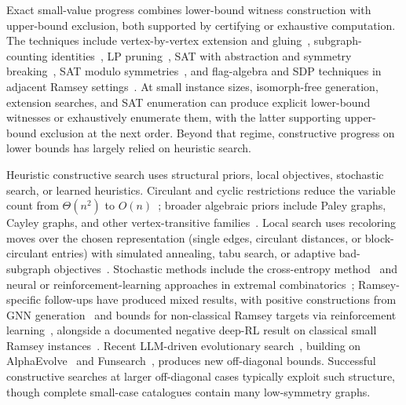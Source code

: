 \documentclass{article}
\begin{document}
Exact small-value progress combines lower-bound witness construction with upper-bound exclusion, both supported by certifying or exhaustive computation. The techniques include vertex-by-vertex extension and gluing~\cite{mckayradziszowski1995r45,angeltveitmckay2018r55leq48}, subgraph-counting identities~\cite{mckayradziszowski1997subgraph}, LP pruning~\cite{angeltveit2026r55leq46}, SAT with abstraction and symmetry breaking~\cite{codish2016r433}, SAT modulo symmetries~\cite{kirchwegerszeider2024}, and flag-algebra and SDP techniques in adjacent Ramsey settings~\cite{razborov2007flag,lidickypfender2021sdp}. At small instance sizes, isomorph-free generation, extension searches, and SAT enumeration can produce explicit lower-bound witnesses or exhaustively enumerate them, with the latter supporting upper-bound exclusion at the next order. Beyond that regime, constructive progress on lower bounds has largely relied on heuristic search.

Heuristic constructive search uses structural priors, local objectives, stochastic search, or learned heuristics. Circulant and cyclic restrictions reduce the variable count from $\Theta(n^2)$ to $O(n)$~\cite{kalbfleisch1965,exootatarevic2015}; broader algebraic priors include Paley graphs, Cayley graphs, and other vertex-transitive families~\cite{mathon1987}. Local search uses recoloring moves over the chosen representation (single edges, circulant distances, or block-circulant entries) with simulated annealing, tabu search, or adaptive bad-subgraph objectives~\cite{piwakowski1996tabu,exootatarevic2015}. Stochastic methods include the cross-entropy method~\cite{Rubinstein2004} and neural or reinforcement-learning approaches in extremal combinatorics~\cite{wagner2021constructions}; Ramsey-specific follow-ups have produced mixed results, with positive constructions from GNN generation~\cite{ghoselevizhang2022} and bounds for non-classical Ramsey targets via reinforcement learning~\cite{ghebleh2024}, alongside a documented negative deep-RL result on classical small Ramsey instances~\cite{berghaus2025}. Recent LLM-driven evolutionary search~\cite{nagda2026reinforcedgenerationcombinatorialstructures}, building on AlphaEvolve~\cite{novikov2025alphaevolve} and Funsearch~\cite{romeraparedes2024funsearch}, produces new off-diagonal bounds. Successful constructive searches at larger off-diagonal cases typically exploit such structure, though complete small-case catalogues contain many low-symmetry graphs.
\end{document}
